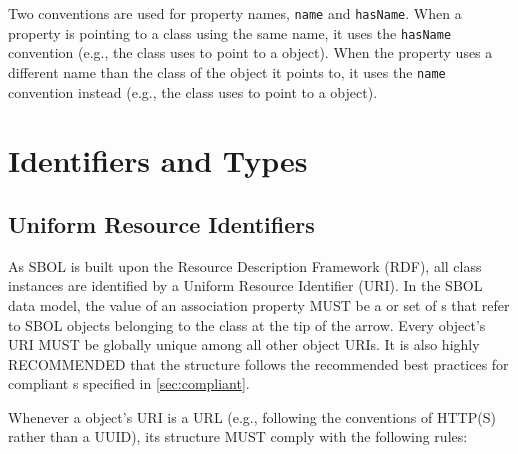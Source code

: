 Two conventions are used for property names, {\tt name} and {\tt hasName}.  
When a property is pointing to a class using the same name, it uses the {\tt hasName} convention (e.g., the  class uses  to point to a  object).
When the property uses a different name than the class of the object it points to, it uses the {\tt name} convention instead (e.g., the  class uses  to point to a  object).


\section{Identifiers and Types}

\subsection{Uniform Resource Identifiers}
\label{sec:URIstructure}

As SBOL is built upon the Resource Description Framework (RDF), all class instances are identified by a Uniform Resource Identifier (URI).  In the SBOL data model, the value of an association property MUST be a  or set of s that refer to SBOL objects belonging to the class at the tip of the arrow.  Every  object's URI MUST be globally unique among all other  object URIs. It is also highly RECOMMENDED that the  structure follows the recommended best practices for compliant s specified in \ref{sec:compliant}.

Whenever a  object's URI is a URL (e.g., following the conventions of HTTP(S) rather than a UUID), its structure MUST comply with the following rules:

